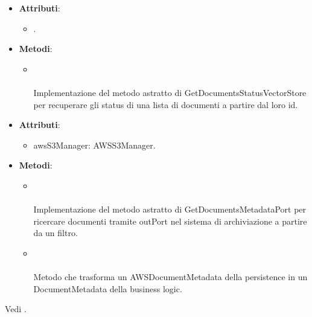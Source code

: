 \documentclass[10pt, a4paper]{article}
\begin{document}
\label{GetDocumentsStatusVectorStoreDettaglio}
\begin{itemize}
    \item \textbf{Attributi}:
    \begin{itemize}
        \item {}.
    \end{itemize}
    \item \textbf{Metodi}:
    \begin{itemize}
        \item {}\\ \\
        Implementazione del metodo astratto di GetDocumentsStatusVectorStore per recuperare gli status di una lista di documenti a partire dal loro id.
    \end{itemize}
\end{itemize}

\label{GetDocumentsListAWSS3Dettaglio}
\begin{itemize}
    \item \textbf{Attributi}:
    \begin{itemize}
        \item awsS3Manager: AWSS3Manager.
    \end{itemize}
    \item \textbf{Metodi}:
    \begin{itemize}
        \item {}\\ \\
        Implementazione del metodo astratto di GetDocumentsMetadataPort per ricercare documenti tramite outPort nel sistema di archiviazione a partire da un filtro.
        \item {}\\ \\
        Metodo che trasforma un AWSDocumentMetadata della persistence in un DocumentMetadata della business logic.
    \end{itemize}
\end{itemize}

Vedi .
\end{document}
